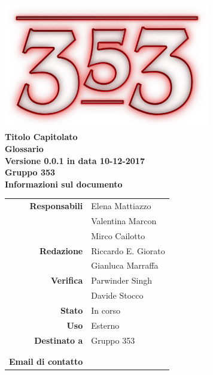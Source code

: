 \documentclass[openany, a4paper, 12pt]{report}
\begin{document}
\begin{titlepage}
	\centering
	\vfill
	{
		\bfseries
		\vskip2cm
		\includegraphics[width=9cm]{../../common/images/logo.png} \\
		\Large Titolo Capitolato\\
		\vfill
		\Huge Glossario\\
		\Large Versione 0.0.1 in data 10-12-2017\\
		\vfill
		\large Gruppo 353\\
		\vfill
	\normalsize Informazioni sul documento\\
\begin{table}[htbp]
	\centering
	\renewcommand\arraystretch{1.2}
	\begin{tabular}{r|l}
		\hline
		\textbf{Responsabili}	& Elena Mattiazzo\\
								& Valentina Marcon\\
								& Mirco Cailotto\\
		
		\textbf{Redazione} 		& Riccardo E. Giorato\\
								& Gianluca Marraffa\\
		
		\textbf{Verifica} 		& Parwinder Singh\\
								& Davide Stocco\\
						
		\textbf{Stato} 			& In corso\\
		\textbf{Uso}			& Esterno\\
		\textbf{Destinato a}   	& Gruppo 353\\
								& \Vardanega\\
								& \Cardin\\
						
		\textbf{Email di contatto}	& \mailleaf
	\end{tabular}
\end{table}
		\vfill
	}    
\end{titlepage}


\printglossaries
 
\end{document}
